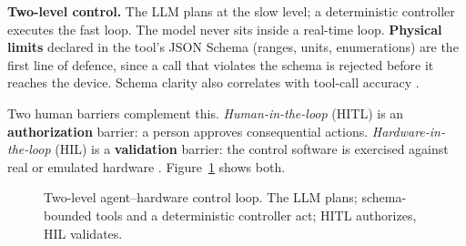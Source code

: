 \documentclass[11pt,a4paper]{article}
\begin{document}
\textbf{Two-level control.} The LLM plans at the slow level; a deterministic controller
executes the fast loop. The model never sits inside a real-time loop. \textbf{Physical
limits} declared in the tool's JSON Schema (ranges, units, enumerations) are the first
line of defence, since a call that violates the schema is rejected before it reaches
the device. Schema clarity also correlates with tool-call accuracy \cite{tooluse2026}.

Two human barriers complement this. \emph{Human-in-the-loop} (HITL) is an
\textbf{authorization} barrier: a person approves consequential actions. \emph{Hardware-in-the-loop}
(HIL) is a \textbf{validation} barrier: the control software is exercised against real or
emulated hardware \cite{opalrt2026}. Figure~\ref{fig:hw} shows both.

\begin{figure}[htbp]
\centering
{}
\caption{Two-level agent--hardware control loop. The LLM plans; schema-bounded tools
and a deterministic controller act; HITL authorizes, HIL validates.}
\label{fig:hw}
\end{figure}
\end{document}
